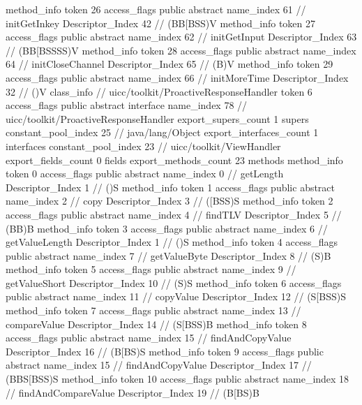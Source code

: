 {{{{{				}
				method_info {
					token	26
					access_flags	public abstract
					name_index	61		// initGetInkey
					Descriptor_Index	42		// (BB[BSS)V
				}
				method_info {
					token	27
					access_flags	public abstract
					name_index	62		// initGetInput
					Descriptor_Index	63		// (BB[BSSSS)V
				}
				method_info {
					token	28
					access_flags	public abstract
					name_index	64		// initCloseChannel
					Descriptor_Index	65		// (B)V
				}
				method_info {
					token	29
					access_flags	public abstract
					name_index	66		// initMoreTime
					Descriptor_Index	32		// ()V
				}
			}
		}
		class_info {		// uicc/toolkit/ProactiveResponseHandler
			token	6
			access_flags	public abstract interface
			name_index	78		// uicc/toolkit/ProactiveResponseHandler
			export_supers_count	1
			supers {
				constant_pool_index	25		// java/lang/Object
			}
			export_interfaces_count	1
			interfaces {
				constant_pool_index	23		// uicc/toolkit/ViewHandler
			}
			export_fields_count	0
			fields {
			}
			export_methods_count	23
			methods {
				method_info {
					token	0
					access_flags	public abstract
					name_index	0		// getLength
					Descriptor_Index	1		// ()S
				}
				method_info {
					token	1
					access_flags	public abstract
					name_index	2		// copy
					Descriptor_Index	3		// ([BSS)S
				}
				method_info {
					token	2
					access_flags	public abstract
					name_index	4		// findTLV
					Descriptor_Index	5		// (BB)B
				}
				method_info {
					token	3
					access_flags	public abstract
					name_index	6		// getValueLength
					Descriptor_Index	1		// ()S
				}
				method_info {
					token	4
					access_flags	public abstract
					name_index	7		// getValueByte
					Descriptor_Index	8		// (S)B
				}
				method_info {
					token	5
					access_flags	public abstract
					name_index	9		// getValueShort
					Descriptor_Index	10		// (S)S
				}
				method_info {
					token	6
					access_flags	public abstract
					name_index	11		// copyValue
					Descriptor_Index	12		// (S[BSS)S
				}
				method_info {
					token	7
					access_flags	public abstract
					name_index	13		// compareValue
					Descriptor_Index	14		// (S[BSS)B
				}
				method_info {
					token	8
					access_flags	public abstract
					name_index	15		// findAndCopyValue
					Descriptor_Index	16		// (B[BS)S
				}
				method_info {
					token	9
					access_flags	public abstract
					name_index	15		// findAndCopyValue
					Descriptor_Index	17		// (BBS[BSS)S
				}
				method_info {
					token	10
					access_flags	public abstract
					name_index	18		// findAndCompareValue
					Descriptor_Index	19		// (B[BS)B
}}}}}
